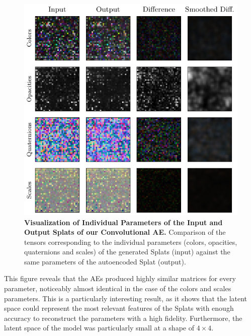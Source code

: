 \begin{figure}
    \centering    \includegraphics[width=0.97\linewidth]{fig/parameters_individual_viz.pdf}
    \caption{\textbf{Visualization of Individual Parameters of the Input and Output Splats of our Convolutional AE.} Comparison of the tensors corresponding to the individual parameters (colors, opacities, quaternions and scales) of the generated Splats (input) against the same parameters of the autoencoded Splat (output).}
    \label{fig:individual-params}
\end{figure}

This figure reveals that the AEs produced highly similar matrices for every parameter, noticeably almost identical in the case of the colors and scales parameters. This is a particularly interesting result, as it shows that the latent space could represent the most relevant features of the Splats with enough accuracy to reconstruct the parameters with a high fidelity. Furthermore, the latent space of the model was particularly small at a shape of $4\times4$.
